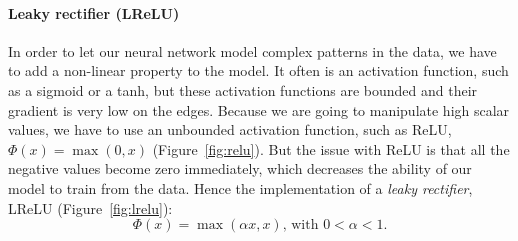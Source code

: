 \documentclass{article}
\begin{document}
            \paragraph{Leaky rectifier (LReLU)} In order to let our neural network model complex patterns in the data, we have to add a non-linear property to the model. It often is an activation function, such as a sigmoid or a tanh, but these activation functions are bounded and their gradient is very low on the edges. Because we are going to manipulate high scalar values, we have to use an unbounded activation function, such as ReLU, $\Phi(x)=\max(0,x)$ (Figure~\ref{fig:relu}). But the issue with ReLU is that all the negative values become zero immediately, which decreases the ability of our model to train from the data. Hence the implementation of a \textit{leaky rectifier}, LReLU (Figure~\ref{fig:lrelu}):
            $$\Phi(x)=\max(\alpha x,x)\mbox{, with } 0<\alpha<1.$$
\end{document}
